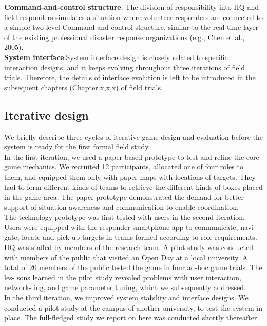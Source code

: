 \textbf{Command-and-control structure}. The division of responsibility into HQ and field responders simulates a situation where volunteer responders are connected to a simple two level Command-and-control structure, similar to the real-time layer of the existing professional disaster response organizations (e.g., Chen et al., 2005).\\

\textbf{System interface}.System interface design is closely related to specific interaction designs, and it keeps evolving throughout three iterations of field trials. Therefore, the details of interface evolution is left to be introduced in the subsequent chapters (Chapter x,x,x) of field trials. \\

\subsection{Iterative design}
We briefly describe three cycles of iterative game design and evaluation before the system is ready for the first formal field study.\\

In the first iteration, we used a paper-based prototype to test and refine the core game mechanics. We recruited 12 participants, allocated one of four roles to them, and equipped them only with paper maps with locations of targets. They had to form different kinds of teams to retrieve the different kinds of boxes placed in the game area. The paper prototype demonstrated the demand for better support of situation awareness and communication to enable coordination.\\

The technology prototype was first tested with users in the second iteration. Users were equipped with the responder smartphone app to communicate, navi- gate, locate and pick up targets in teams formed according to role requirements. HQ was staffed by members of the research team. A pilot study was conducted with members of the public that visited an Open Day at a local university. A total of 20 members of the public tested the game in four ad-hoc game trials. The les- sons learned in the pilot study revealed problems with user interaction, network- ing, and game parameter tuning, which we subsequently addressed.\\

In the third iteration, we improved system stability and interface designs. We conducted a pilot study at the campus of another university, to test the system in place. The full-fledged study we report on here was conducted shortly thereafter.\\

